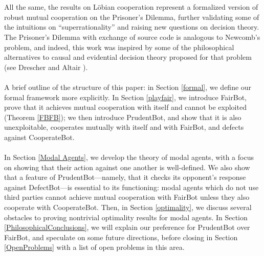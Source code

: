 \documentclass[12pt, letterpaper]{article}
\numberwithin{equation}{section}
\begin{document}
\\
\\ All the same, the results on L\"{o}bian cooperation represent a formalized version of robust mutual cooperation on the Prisoner's Dilemma, further validating some of the intuitions on ``superrationality'' and raising new questions on decision theory. The Prisoner's Dilemma with exchange of source code is analogous to Newcomb's problem, and indeed, this work was inspired by some of the philosophical alternatives to causal and evidential decision theory proposed for that problem (see Drescher \cite{Drescher} and Altair \cite{Altair}).
\\
\\ A brief outline of the structure of this paper: in Section \ref{formal}, we define our formal framework more explicitly. In Section \ref{playfair}, we introduce FairBot, prove that it achieves mutual cooperation with itself and cannot be exploited (Theorem \ref{FBFB}); we then introduce PrudentBot, and show that it is also unexploitable, cooperates mutually with itself and with FairBot, and defects against CooperateBot.
\\
\\ In Section \ref{Modal Agents}, we develop the theory of modal agents, with a focus on showing that their action against one another is well-defined. We also show that a feature of PrudentBot---namely, that it checks its opponent's response against DefectBot---is essential to its functioning: modal agents which do not use third parties cannot achieve mutual cooperation with FairBot unless they also cooperate with CooperateBot. Then, in Section \ref{optimality}, we discuss several obstacles to proving nontrivial optimality results for modal agents. In Section \ref{PhilosophicalConclusions}, we will explain our preference for PrudentBot over FairBot, and speculate on some future directions, before closing in Section \ref{OpenProblems} with a list of open problems in this area.
\end{document}
